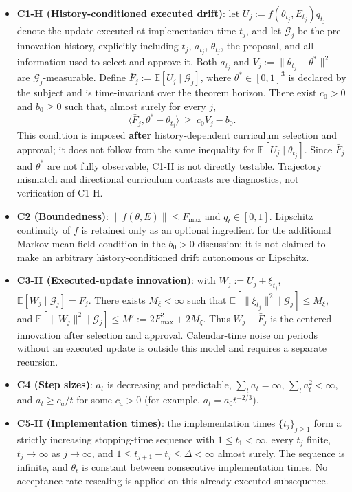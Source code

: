 \documentclass[
  11pt]{article}
\providecommand{\tightlist}{%
  \setlength{\itemsep}{0pt}\setlength{\parskip}{0pt}}
\begin{document}
\begin{itemize}
\tightlist
\item
  \textbf{C1-H (History-conditioned executed drift)}: let
  \(U_j:=f(\theta_{t_j},E_{t_j})q_{t_j}\) denote the update executed at
  implementation time \(t_j\), and let \(\mathcal G_j\) be the
  pre-innovation history, explicitly including \(t_j\), \(a_{t_j}\),
  \(\theta_{t_j}\), the proposal, and all information used to select and
  approve it. Both \(a_{t_j}\) and \(V_j:=\|\theta_{t_j}-\theta^*\|^2\)
  are \(\mathcal G_j\)-measurable. Define
  \(\bar F_j:=\mathbb E[U_j\mid\mathcal G_j]\), where
  \(\theta^*\in[0,1]^3\) is declared by the subject and is
  time-invariant over the theorem horizon. There exist \(c_0>0\) and
  \(b_0\ge0\) such that, almost surely for every \(j\),
  \[\langle\bar F_j,\theta^*-\theta_{t_j}\rangle\ \ge\ c_0V_j-b_0.\]
  This condition is imposed \textbf{after} history-dependent curriculum
  selection and approval; it does not follow from the same inequality
  for \(\mathbb E[U_j\mid\theta_{t_j}]\). Since \(\bar F_j\) and
  \(\theta^*\) are not fully observable, C1-H is not directly testable.
  Trajectory mismatch and directional curriculum contrasts are
  diagnostics, not verification of C1-H.
\item
  \textbf{C2 (Boundedness)}: \(\|f(\theta,E)\|\le F_{\max}\) and
  \(q_t\in[0,1]\). Lipschitz continuity of \(f\) is retained only as an
  optional ingredient for the additional Markov mean-field condition in
  the \(b_0>0\) discussion; it is not claimed to make an arbitrary
  history-conditioned drift autonomous or Lipschitz.
\item
  \textbf{C3-H (Executed-update innovation)}: with
  \(W_j:=U_j+\xi_{t_j}\), \(\mathbb E[W_j\mid\mathcal G_j]=\bar F_j\).
  There exists \(M_\xi<\infty\) such that
  \(\mathbb E[\|\xi_{t_j}\|^2\mid\mathcal G_j]\le M_\xi\), and
  \(\mathbb E[\|W_j\|^2\mid\mathcal G_j]\le M':=2F_{\max}^2+2M_\xi\).
  Thus \(W_j-\bar F_j\) is the centered innovation after selection and
  approval. Calendar-time noise on periods without an executed update is
  outside this model and requires a separate recursion.
\item
  \textbf{C4 (Step sizes)}: \(a_t\) is decreasing and predictable,
  \(\sum_ta_t=\infty\), \(\sum_ta_t^2<\infty\), and \(a_t\ge c_a/t\) for
  some \(c_a>0\) (for example, \(a_t=a_0t^{-2/3}\)).
\item
  \textbf{C5-H (Implementation times)}: the implementation times
  \(\{t_j\}_{j\ge1}\) form a strictly increasing stopping-time sequence
  with \(1\le t_1<\infty\), every \(t_j\) finite, \(t_j\to\infty\) as
  \(j\to\infty\), and \(1\le t_{j+1}-t_j\le\Delta<\infty\) almost
  surely. The sequence is infinite, and \(\theta_t\) is constant between
  consecutive implementation times. No acceptance-rate rescaling is
  applied on this already executed subsequence.
\end{itemize}
\end{document}

